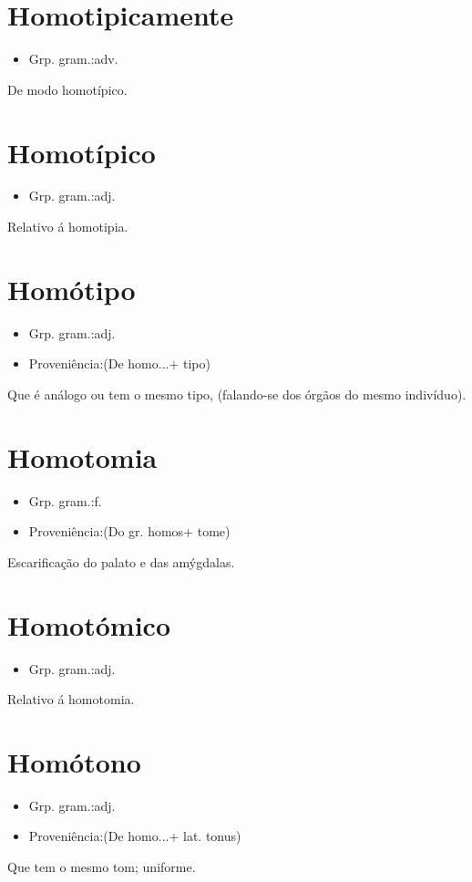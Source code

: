 \documentclass{article}
\begin{document}
\section{Homotipicamente}
\begin{itemize}
\item {Grp. gram.:adv.}
\end{itemize}
De modo homotípico.
\section{Homotípico}
\begin{itemize}
\item {Grp. gram.:adj.}
\end{itemize}
Relativo á homotipia.
\section{Homótipo}
\begin{itemize}
\item {Grp. gram.:adj.}
\end{itemize}
\begin{itemize}
\item {Proveniência:(De \textunderscore homo...\textunderscore  + \textunderscore tipo\textunderscore )}
\end{itemize}
Que é análogo ou tem o mesmo tipo, (falando-se dos órgãos do mesmo indivíduo).
\section{Homotomia}
\begin{itemize}
\item {Grp. gram.:f.}
\end{itemize}
\begin{itemize}
\item {Proveniência:(Do gr. \textunderscore homos\textunderscore  + \textunderscore tome\textunderscore )}
\end{itemize}
Escarificação do palato e das amýgdalas.
\section{Homotómico}
\begin{itemize}
\item {Grp. gram.:adj.}
\end{itemize}
Relativo á homotomia.
\section{Homótono}
\begin{itemize}
\item {Grp. gram.:adj.}
\end{itemize}
\begin{itemize}
\item {Proveniência:(De \textunderscore homo...\textunderscore  + lat. \textunderscore tonus\textunderscore )}
\end{itemize}
Que tem o mesmo tom; uniforme.
\end{document}
